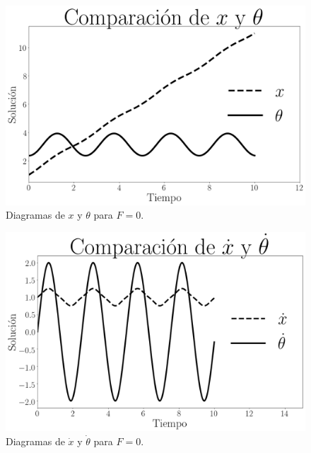 \documentclass[12pt,letterpaper]{article}
\begin{document}
\begin{figure}[h]
 \centering
 \includegraphics[scale=0.3]{img/dp_x_theta_f0.png}
 \caption{Diagramas de $x$ y $\theta$ para $F=0$.}
 \label{fig: dp x theta force 0}
\end{figure}

\begin{figure}[h]
 \centering
 \includegraphics[scale=0.4]{img/dp_dx_dtheta_f0.png}
 \caption{Diagramas de $\dot{x}$ y $\dot{\theta}$ para $F=0$.}
 \label{fig: dp dx dtheta force 0}
\end{figure}
\end{document}
